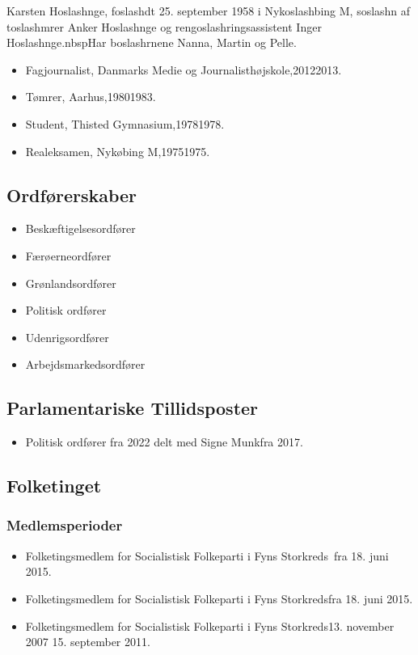 \documentclass[11pt, a4paper]{awesome-cv}
\begin{document}
\makecvheader[R]
\makelettertitle
\begin{cvletter}
Karsten Hoslashnge, foslashdt 25. september 1958 i Nykoslashbing M, soslashn af toslashmrer Anker Hoslashnge og rengoslashringsassistent Inger Hoslashnge.nbspHar boslashrnene Nanna, Martin og Pelle.

\begin{itemize}
\item Fagjournalist, Danmarks Medie og Journalisthøjskole,20122013.
\item Tømrer, Aarhus,19801983.
\item Student, Thisted Gymnasium,19781978.
\item Realeksamen, Nykøbing M,19751975.
\end{itemize}
\subsection*{Ordførerskaber}
\begin{itemize}
\item Beskæftigelsesordfører
\item Færøerneordfører
\item Grønlandsordfører
\item Politisk ordfører
\item Udenrigsordfører
\item Arbejdsmarkedsordfører
\end{itemize}
\subsection*{Parlamentariske Tillidsposter}
\begin{itemize}
\item Politisk ordfører fra 2022 delt med Signe Munkfra 2017.
\end{itemize}
\subsection*{Folketinget}
\subsubsection*{Medlemsperioder}
\begin{itemize}
\item Folketingsmedlem for Socialistisk Folkeparti i Fyns Storkreds fra 18. juni 2015.
\item Folketingsmedlem for Socialistisk Folkeparti i Fyns Storkredsfra 18. juni 2015.
\item Folketingsmedlem for Socialistisk Folkeparti i Fyns Storkreds13. november 2007  15. september 2011.
\end{itemize}

\end{cvletter}
\end{document}
